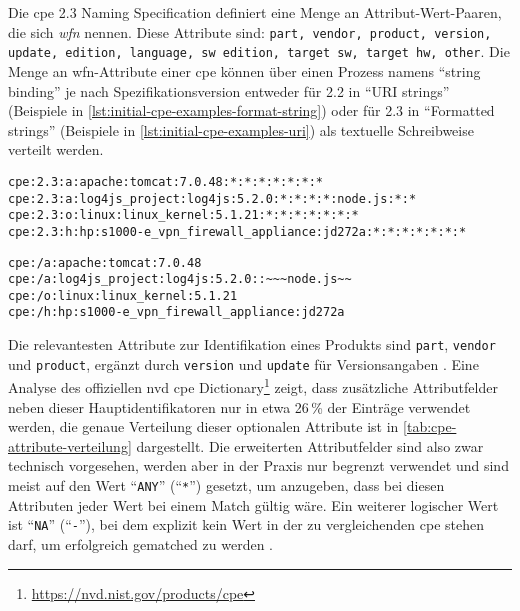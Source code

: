 Die \acrshort{cpe} 2.3 Naming Specification definiert eine Menge an Attribut-Wert-Paaren, die sich \textit{\acrfull{wfn}} nennen.
Diese Attribute sind: \texttt{part, vendor, product, version, update, edition, language, sw edition, target sw, target hw, other}.
Die Menge an \acrshort{wfn}-Attribute einer \acrshort{cpe} können über einen Prozess namens \enquote{string binding} je nach Spezifikationsversion entweder für 2.2 in \enquote{URI strings} (Beispiele in \autoref{lst:initial-cpe-examples-format-string}) oder für 2.3 in \enquote{Formatted strings} (Beispiele in \autoref{lst:initial-cpe-examples-uri}) als textuelle Schreibweise verteilt werden.

\begin{lstlisting}[caption=Beispielhafte \acrshort{wfn} als \acrshort{cpe} 2.3 Format Strings,label=lst:initial-cpe-examples-format-string]
cpe:2.3:a:apache:tomcat:7.0.48:*:*:*:*:*:*:*
cpe:2.3:a:log4js_project:log4js:5.2.0:*:*:*:*:node.js:*:*
cpe:2.3:o:linux:linux_kernel:5.1.21:*:*:*:*:*:*:*
cpe:2.3:h:hp:s1000-e_vpn_firewall_appliance:jd272a:*:*:*:*:*:*:*
\end{lstlisting}

\begin{lstlisting}[caption=Beispielhafte \acrshort{wfn} als \acrshort{cpe} 2.2 URI,label=lst:initial-cpe-examples-uri]
cpe:/a:apache:tomcat:7.0.48
cpe:/a:log4js_project:log4js:5.2.0::~~~node.js~~
cpe:/o:linux:linux_kernel:5.1.21
cpe:/h:hp:s1000-e_vpn_firewall_appliance:jd272a
\end{lstlisting}

Die relevantesten Attribute zur Identifikation eines Produkts sind \texttt{part}, \texttt{vendor} und \texttt{product}, ergänzt durch \texttt{version} und \texttt{update} für Versionsangaben \autocite{Cheikes_Waltermire_Scarfone_2011}.
Eine Analyse des offiziellen \acrshort{nvd} \acrshort{cpe} Dictionary\footnote{\url{https://nvd.nist.gov/products/cpe}} zeigt, dass zusätzliche Attributfelder neben dieser Hauptidentifikatoren nur in etwa 26\,\% der Einträge verwendet werden, die genaue Verteilung dieser optionalen Attribute ist in \autoref{tab:cpe-attribute-verteilung} dargestellt.
Die erweiterten Attributfelder sind also zwar technisch vorgesehen, werden aber in der Praxis nur begrenzt verwendet und sind meist auf den Wert \enquote{\texttt{ANY}} (\enquote{\texttt{*}}) gesetzt, um anzugeben, dass bei diesen Attributen jeder Wert bei einem Match gültig wäre.
Ein weiterer logischer Wert ist \enquote{\texttt{NA}} (\enquote{\texttt{-}}), bei dem explizit kein Wert in der zu vergleichenden \acrshort{cpe} stehen darf, um erfolgreich gematched zu werden \autocite{Parmelee_Booth_Waltermire_Scarfone_2011}.

